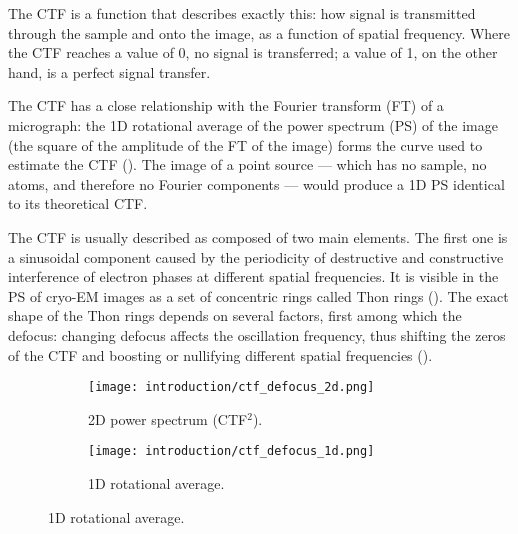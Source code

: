 The CTF is a function that describes exactly this: how signal is transmitted through the sample and onto the image, as a function of spatial frequency.
Where the CTF reaches a value of 0, no signal is transferred; a value of 1, on the other hand, is a perfect signal transfer.

The CTF has a close relationship with the Fourier transform (FT) of a micrograph: the 1D rotational average of the power spectrum (PS) of the image (the square of the amplitude of the FT of the image) forms the curve used to estimate the CTF ().
The image of a point source --- which has no sample, no atoms, and therefore no Fourier components --- would produce a 1D PS identical to its theoretical CTF.

The CTF is usually described as composed of two main elements.
The first one is a sinusoidal component caused by the periodicity of destructive and constructive interference of electron phases at different spatial frequencies.
It is visible in the PS of cryo-EM images as a set of concentric rings called Thon rings ().
The exact shape of the Thon rings depends on several factors, first among which the defocus: changing defocus affects the oscillation frequency, thus shifting the zeros of the CTF and boosting or nullifying different spatial frequencies ().

\begin{figure}[!ht]
    \centering
    \begin{subfigure}{\textwidth}
        \centering
        \texttt{[image: introduction/ctf\_defocus\_2d.png]}
        \caption{2D power spectrum (CTF$^2$).}
        \label{fig:em_ctf_defocus_2d}
    \end{subfigure}%

    \begin{subfigure}{\textwidth}
        \centering
        \texttt{[image: introduction/ctf\_defocus\_1d.png]}
        \caption{1D rotational average.}
        \label{fig:em_ctf_defocus_1d}
    \end{subfigure}%

    \label{fig:em_ctf_defocus}
\end{figure}

